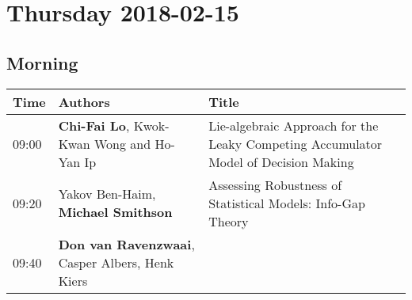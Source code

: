 \documentclass[]{article}
\begin{document}
\section{Thursday 2018-02-15}\label{thursday-2018-02-15}

\subsection{Morning}\label{morning-1}

\begin{longtable}[]{@{}lll@{}}
\toprule
\begin{minipage}[b]{0.03\columnwidth}\raggedright\strut
Time\strut
\end{minipage} & \begin{minipage}[b]{0.35\columnwidth}\raggedright\strut
Authors\strut
\end{minipage} & \begin{minipage}[b]{0.53\columnwidth}\raggedright\strut
Title\strut
\end{minipage}\tabularnewline
\midrule
\endhead
\begin{minipage}[t]{0.03\columnwidth}\raggedright\strut
09:00\strut
\end{minipage} & \begin{minipage}[t]{0.35\columnwidth}\raggedright\strut
\textbf{Chi-Fai Lo}, Kwok-Kwan Wong and Ho-Yan Ip\strut
\end{minipage} & \begin{minipage}[t]{0.53\columnwidth}\raggedright\strut
Lie-algebraic Approach for the Leaky Competing Accumulator Model of
Decision Making\strut
\end{minipage}\tabularnewline
\begin{minipage}[t]{0.03\columnwidth}\raggedright\strut
09:20\strut
\end{minipage} & \begin{minipage}[t]{0.35\columnwidth}\raggedright\strut
Yakov Ben-Haim, \textbf{Michael Smithson}\strut
\end{minipage} & \begin{minipage}[t]{0.53\columnwidth}\raggedright\strut
Assessing Robustness of Statistical Models: Info-Gap Theory\strut
\end{minipage}\tabularnewline
\begin{minipage}[t]{0.03\columnwidth}\raggedright\strut
09:40\strut
\end{minipage} & \begin{minipage}[t]{0.35\columnwidth}\raggedright\strut
\textbf{Don van Ravenzwaai}, Casper Albers, Henk Kiers\strut

\end{minipage}
\end{longtable}
\end{document}
